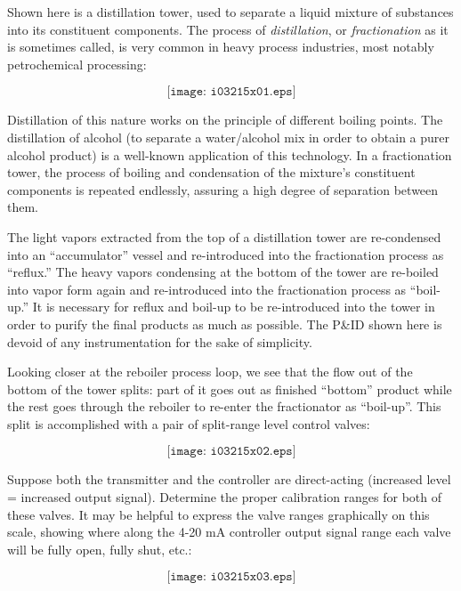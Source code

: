 

Shown here is a distillation tower, used to separate a liquid mixture of substances into its constituent components.  The process of {\it distillation}, or {\it fractionation} as it is sometimes called, is very common in heavy process industries, most notably petrochemical processing:
 
$$\texttt{[image: i03215x01.eps]}$$

Distillation of this nature works on the principle of different boiling points.  The distillation of alcohol (to separate a water/alcohol mix in order to obtain a purer alcohol product) is a well-known application of this technology.  In a fractionation tower, the process of boiling and condensation of the mixture's constituent components is repeated endlessly, assuring a high degree of separation between them.

The light vapors extracted from the top of a distillation tower are re-condensed into an ``accumulator'' vessel and re-introduced into the fractionation process as ``reflux.''  The heavy vapors condensing at the bottom of the tower are re-boiled into vapor form again and re-introduced into the fractionation process as ``boil-up.''  It is necessary for reflux and boil-up to be re-introduced into the tower in order to purify the final products as much as possible.  The P\&ID shown here is devoid of any instrumentation for the sake of simplicity.

Looking closer at the reboiler process loop, we see that the flow out of the bottom of the tower splits: part of it goes out as finished ``bottom'' product while the rest goes through the reboiler to re-enter the fractionator as ``boil-up''.  This split is accomplished with a pair of split-range level control valves:

$$\texttt{[image: i03215x02.eps]}$$

Suppose both the transmitter and the controller are direct-acting (increased level = increased output signal).  Determine the proper calibration ranges for both of these valves.  It may be helpful to express the valve ranges graphically on this scale, showing where along the 4-20 mA controller output signal range each valve will be fully open, fully shut, etc.:

$$\texttt{[image: i03215x03.eps]}$$

